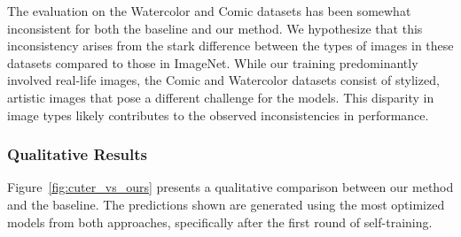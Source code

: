 The evaluation on the Watercolor and Comic datasets has been somewhat inconsistent for both the baseline and our method. We hypothesize that this inconsistency arises from the stark difference between the types of images in these datasets compared to those in ImageNet. While our training predominantly involved real-life images, the Comic and Watercolor datasets consist of stylized, artistic images that pose a different challenge for the models. This disparity in image types likely contributes to the observed inconsistencies in performance.

\subsubsection{Qualitative Results}

Figure~\ref{fig:cuter_vs_ours} presents a qualitative comparison between our method and the baseline. The predictions shown are generated using the most optimized models from both approaches, specifically after the first round of self-training.

